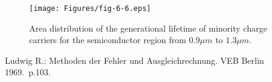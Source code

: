 \begin{figure}[h!]\centering
  \texttt{[image: Figures/fig-6-6.eps]}
  \caption[Area distribution of the generational lifetime of minority
    charge carriers]{Area distribution of the generational lifetime of
    minority charge carriers for the semiconductor region from $0.9
    \mu m$ to $1.3 \mu m$.}\label{fig:6.6}
\end{figure}

\begin{thebibliography}{}
  Ludwig R.: Methoden der Fehler und Ausgleichrechnung. VEB Berlin 1969.\ p.103.
\end{thebibliography}
